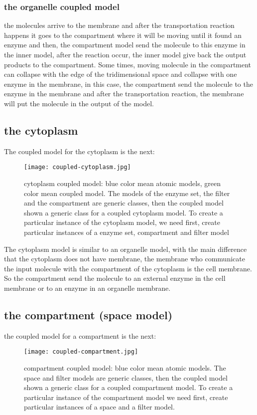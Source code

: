 \documentclass[12pt]{article}
\begin{document}
\subsubsection*{the organelle coupled model}
the molecules arrive to the membrane and after the transportation reaction happens it goes to the compartment where it will be moving until it found an enzyme and then, the compartment model send the molecule to this enzyme in the inner model, after the reaction occur, the inner model give back the output products to the compartment. Some times, moving molecule in the compartment can collapse with the edge of the tridimensional space and collapse with one enzyme in the membrane, in this case, the compartment send the molecule to the enzyme in the membrane and after the transportation reaction, the membrane will put the molecule in the output of the model.

\subsection*{the cytoplasm}
The coupled model for the cytoplasm is the next:

\begin{figure}[h!]
 \centering
  \texttt{[image: coupled-cytoplasm.jpg]}
 \caption{cytoplasm coupled model: blue color mean atomic models, green color mean coupled model. The models of the enzyme set, the filter and the compartment are generic classes, then the coupled model shown a generic class for a coupled cytoplasm model. To create a particular instance of the cytoplasm model, we need first, create particular instances of a enzyme set, compartment and filter model}
\end{figure}

The cytoplasm model is similar to an organelle model, with the main difference that the cytoplasm does not have membrane, the membrane who communicate the input molecule with the compartment of the cytoplasm is the cell membrane. So the compartment send the molecule to an external enzyme in the cell membrane or to an enzyme in an organelle membrane.

\newpage
\subsection*{the compartment (space model)}

the coupled model for a compartment is the next:

\begin{figure}[h!]
 \centering
  \texttt{[image: coupled-compartment.jpg]}
 \caption{compartment coupled model: blue color mean atomic models. The space and filter models are generic classes, then the coupled model shown a generic class for a coupled compartment model. To create a particular instance of the compartment model we need first, create particular instances of a space and a filter model.}
\end{figure}
\end{document}
